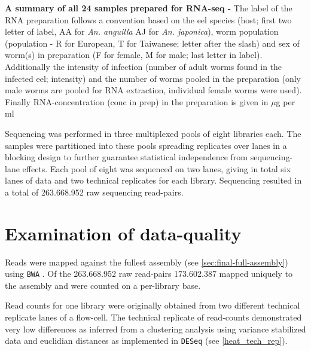 \begin{table}[h]
\begin{center}
\caption[Summary of RNA preparation]{\textbf{A summary of all 24
    samples prepared for RNA-seq -} The label of the RNA preparation
  follows a convention based on the eel species (host; first two
  letter of label, AA for \textit{An. anguilla} AJ for
  \textit{An. japonica}), worm population (population - R for
  European, T for Taiwanese; letter after the slash) and sex of
  worm(s) in preparation (F for female, M for male; last letter in
  label). Additionally the intensity of infection (number of adult
  worms found in the infected eel; intensity) and the number of worms
  pooled in the preparation (only male worms are pooled for RNA
  extraction, individual female worms were used). Finally
  RNA-concentration (conc in prep) in the preparation is given in
  $\mu$g per ml}
\label{tab:lib-prep}
\end{center}
\end{table}

\afterpage{\clearpage}

Sequencing was performed in three multiplexed pools of eight libraries
each. The samples were partitioned into these pools spreading
replicates over lanes in a blocking design to further guarantee
statistical independence from sequencing-lane effects. Each pool of
eight was sequenced on two lanes, giving in total six lanes of data
and two technical replicates for each library. Sequencing resulted in
a total of 263.668.952 raw sequencing read-pairs.

\section{Examination of data-quality}

Reads were mapped against the fullest assembly (see
\ref{sec:final-full-assembly}) using \texttt{BWA}
\cite{pmid20080505}. Of the 263.668.952 raw read-pairs 173.602.387
mapped uniquely to the assembly and were counted on a per-library
base.

Read counts for one library were originally obtained from two
different technical replicate lanes of a flow-cell. The technical
replicate of read-counts demonstrated very low differences as inferred
from a clustering analysis using variance stabilized data and
euclidian distances as implemented in \texttt{DESeq}
\cite{pmid20979621} (see \ref{heat_tech_rep}).



